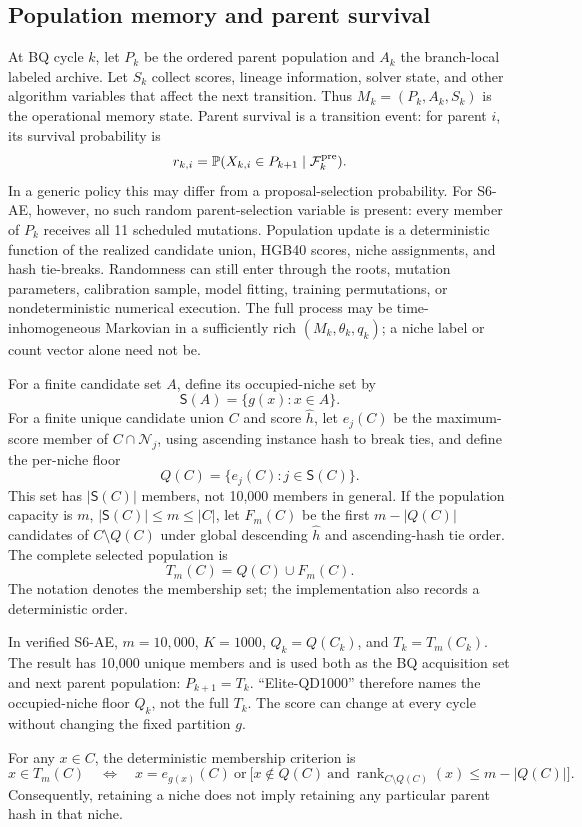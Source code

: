 \subsection{Population memory and parent survival}
At BQ cycle $k$, let $P_k$ be the ordered parent population and $A_k$ the
branch-local labeled archive. Let $S_k$
collect scores, lineage information, solver state, and other algorithm
variables that affect the next transition. Thus $M_k=(P_k,A_k,S_k)$ is the
operational memory state. Parent survival is a transition event: for parent
$i$, its survival probability is
\[
 r_{k,i}=\mathbb{P}(X_{k,i}\in P_{k+1}\mid\mathcal{F}_{k}^{\rm pre}).
\]
In a generic policy this may differ from a proposal-selection probability.
For S6-AE, however, no such random parent-selection variable is present:
every member of $P_k$ receives all 11 scheduled mutations. Population update
is a deterministic function of the realized candidate union, HGB40 scores,
niche assignments, and hash tie-breaks. Randomness can still enter through
the roots, mutation parameters, calibration sample, model fitting, training
permutations, or nondeterministic numerical execution. The full process may
be time-inhomogeneous Markovian in a sufficiently rich
$(M_k,\theta_k,q_k)$; a niche label or count vector alone need not be.

For a finite candidate set $A$, define its occupied-niche set by
\[
 \mathsf S(A)=\{g(x):x\in A\}.
\]
For a finite unique candidate union $C$ and score $\widehat h$, let
$e_j(C)$ be the maximum-score member of $C\cap\mathcal N_j$, using ascending
instance hash to break ties, and define the per-niche floor
\[
 Q(C)=\{e_j(C):j\in\mathsf S(C)\}.
\]
This set has $|\mathsf S(C)|$ members, not 10,000 members in general. If the
population capacity is $m$, $|\mathsf S(C)|\leq m\leq|C|$, let $F_m(C)$ be the
first $m-|Q(C)|$ candidates of $C\setminus Q(C)$ under global descending
$\widehat h$ and ascending-hash tie order. The complete selected population is
\[
 T_m(C)=Q(C)\cup F_m(C).
\]
The notation denotes the membership set; the implementation also records a
deterministic order.

In verified S6-AE, $m=10{,}000$, $K=1000$, $Q_k=Q(C_k)$, and
$T_k=T_m(C_k)$. The result has 10,000 unique members and is used both as the
BQ acquisition set and next parent population: $P_{k+1}=T_k$.
``Elite-QD1000'' therefore names the occupied-niche floor $Q_k$, not the full
$T_k$. The score can change at every cycle without changing the fixed
partition $g$.

For any $x\in C$, the deterministic membership criterion is
\[
 x\in T_m(C)\quad\Longleftrightarrow\quad
 x=e_{g(x)}(C)\ \text{or}\
 \bigl[x\notin Q(C)\ \text{and}\
 \operatorname{rank}_{C\setminus Q(C)}(x)\leq m-|Q(C)|\bigr].
\]
Consequently, retaining a niche does not imply retaining any particular
parent hash in that niche.


